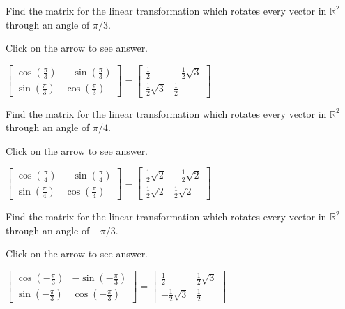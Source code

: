 \documentclass{ximera}
\begin{document}
\begin{problem}\label{prb:6.11}  Find the matrix for the linear transformation which
rotates every vector in $\mathbb{R}^{2}$ through an angle of $\pi /3.$

Click on the arrow to see answer.
\begin{expandable}
$\left[
\begin{array}{cc}
\cos \left(
\frac{\pi }{3}\right) & -\sin \left( \frac{\pi }{3}\right) \\
\sin \left( \frac{\pi }{3}\right) & \cos \left( \frac{\pi }{3}\right)%
\end{array}
\right] = \left[
\begin{array}{cc}
\frac{1}{2} & -\frac{1}{2}\sqrt{3} \\
\frac{1}{2}\sqrt{3} & \frac{1}{2}
\end{array}
\right] $
\end{expandable}
\end{problem}


\begin{problem}\label{prb:6.12} Find the matrix for the linear transformation which rotates every
vector in $\mathbb{R}^{2}$ through an angle of $\pi /4.$

Click on the arrow to see answer.
\begin{expandable}
$\left[
\begin{array}{cc}
\cos \left( \frac{\pi }{4}\right) & -\sin \left( \frac{\pi }{4}\right) \\
\sin \left( \frac{\pi }{4}\right) & \cos \left( \frac{\pi }{4}\right)
\end{array}
\right] = \left[
\begin{array}{cc}
\frac{1}{2}\sqrt{2} & -\frac{1}{2}\sqrt{2} \\
\frac{1}{2}\sqrt{2} & \frac{1}{2}\sqrt{2}
\end{array}
\right] $
\end{expandable}
\end{problem}

\begin{problem}\label{prb:6.13} Find the matrix for the linear transformation which rotates every
vector in $\mathbb{R}^{2}$ through an angle of $-\pi /3.$

Click on the arrow to see answer.
\begin{expandable}
$\left[
\begin{array}{cc}
\cos \left( -\frac{\pi }{3}\right) & -\sin \left( -\frac{\pi }{3}\right) \\
\sin \left( -\frac{\pi }{3}\right) & \cos \left( -\frac{\pi }{3}\right)
\end{array}
\right] = \left[
\begin{array}{cc}
\frac{1}{2} & \frac{1}{2}\sqrt{3} \\
-\frac{1}{2}\sqrt{3} & \frac{1}{2}
\end{array}
\right] $
\end{expandable}
\end{problem}
\end{document}
